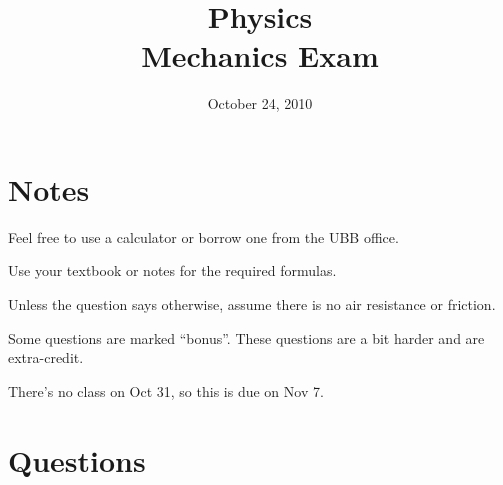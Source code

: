 \documentclass[fleqn,addpoints]{exam}
\title{Physics \\ Mechanics Exam}
\date{October 24, 2010}
\begin{document}
\maketitle

\ifprintanswers
\else
\begin{center}
\gradetable[h][pages]
\bonusgradetable[h][pages]
\end{center}

\fi

\ifprintanswers
\else
\section{Notes}

\begin{itemize*}
  \item Feel free to use a calculator or borrow one from the UBB office.
  \item Use your textbook or notes for the required formulas.
  \item Unless the question says otherwise, assume there is no air resistance or
    friction.
  \item Some questions are marked ``bonus''.  These questions are a bit harder
    and are extra-credit.
  \item There's no class on Oct 31, so this is due on Nov 7.
\end{itemize*}

\fi
\section{Questions}
\end{document}
